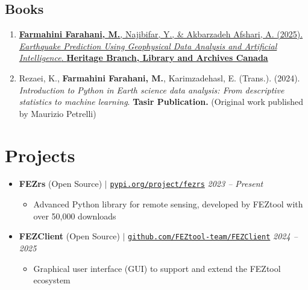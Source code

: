 \documentclass[letterpaper,11pt]{article}
\begin{document}
\begin{justify}
		\subsection*{Books}
		\begin{enumerate}[label=\arabic*.,left=0pt,topsep=7.5pt,partopsep=0pt,itemsep=3.5pt,parsep=0pt]
			\item \href{https://www.amazon.com/dp/106932437X/ref=tmm_pap_swatch_0?_encoding=UTF8&dib_tag=se&dib=eyJ2IjoiMSJ9.fV6NcKzNqVmNMx01e9olJh9RUoGgbt3bwYVVMROKdEU.v8uasEadi-iUYNyBqfXdQtpDWmK8WfYL80Y5MgFWLiI&qid=1748198567&sr=1-2}{\textbf{Farmahini Farahani, M.}, Najibifar, Y., \& Akbarzadeh Afshari, A. (2025). \textit{Earthquake Prediction Using Geophysical Data Analysis and Artificial Intelligence}. \textbf{Heritage Branch, Library and Archives Canada}} 
			\item Rezaei, K., \textbf{Farmahini Farahani, M.}, Karimzadehasl, E. (Trans.). (2024). \textit{Introduction to Python in Earth science data analysis: From descriptive statistics to machine learning}. \textbf{Tasir Publication.} (Original work published by Maurizio Petrelli)
			
		\end{enumerate}
	\end{justify}
	\vspace{-1.8em}
	
	\section{Projects}
	
	\begin{itemize}[left=0pt, label={}, topsep=7.5pt, partopsep=0pt, itemsep=6pt, parsep=0pt]
		\item \textbf{FEZrs} (Open Source) $|$ \normalfont\href{https://pypi.org/project/fezrs/}{\texttt{pypi.org/project/fezrs}} \hfill \textit{2023 – Present}
		\begin{itemize}[left=15pt, label=\textbullet, topsep=4pt, partopsep=0pt, itemsep=3pt, parsep=0pt]
			\item Advanced Python library for remote sensing, developed by FEZtool with over 50,000 downloads
		\end{itemize}
		
	\end{itemize}
	\begin{itemize}[left=0pt, label={}, topsep=7.5pt, partopsep=0pt, itemsep=6pt, parsep=0pt]
		\item \textbf{FEZClient} (Open Source) $|$ \normalfont\href{https://github.com/FEZtool-team/FEZClient}{\texttt{github.com/FEZtool-team/FEZClient}} \hfill \textit{2024 -- 2025}
		\begin{itemize}[left=15pt, label=\textbullet, topsep=4pt, partopsep=0pt, itemsep=3pt, parsep=0pt]
			\item Graphical user interface (GUI) to support and extend the FEZtool ecosystem
			
		\end{itemize}
	\end{itemize}
	
\end{document}
